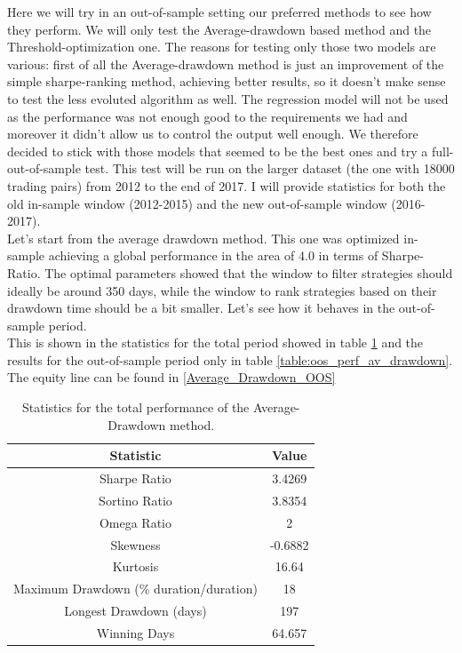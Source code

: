 Here we will try in an out-of-sample setting our preferred methods to see how they perform. We will only test the Average-drawdown based method and the Threshold-optimization one. The reasons for testing only those two models are various: first of all the Average-drawdown method is just an improvement of the simple sharpe-ranking method, achieving better results, so it doesn't make sense to test the less evoluted algorithm as well. The regression model will not be used as the performance was not enough good to the requirements we had and moreover it didn't allow us to control the output well enough. We therefore decided to stick with those models that seemed to be the best ones and try a full-out-of-sample test. This test will be run on the larger dataset (the one with 18000 trading pairs) from 2012 to the end of 2017. I will provide statistics for both the old in-sample window (2012-2015) and the new out-of-sample window (2016-2017).\\
Let's start from the average drawdown method. This one was optimized in-sample achieving a global performance in the area of 4.0 in terms of Sharpe-Ratio. The optimal parameters showed that the window to filter strategies should ideally be around 350 days, while the window to rank strategies based on their drawdown time should be a bit smaller. Let's see how it behaves in the out-of-sample period.\\
This is shown in the statistics for the total period showed in table \ref{table:tot_perf_av_drawdown} and the results for the out-of-sample period only in table \ref{table:oos_perf_av_drawdown}. The equity line can be found in \ref{Average_Drawdown_OOS}

\begin{table}
	\centering
	\begin{tabular}{c|c}
		\textbf{Statistic} & \textbf{Value} \\\hline
		Sharpe Ratio & 3.4269 \\ 
		Sortino Ratio & 3.8354 \\ 
		Omega Ratio & 2 \\ 
		Skewness & -0.6882 \\ 
		Kurtosis & 16.64 \\ 
		Maximum Drawdown (\% duration/duration) & 18 \\ 
		Longest Drawdown (days) & 197 \\ 
		Winning Days & 64.657 \\ 
	\end{tabular}
	\caption{\label{table:tot_perf_av_drawdown} Statistics for the total performance of the Average-Drawdown method.}
\end{table}


